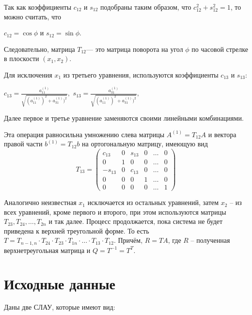 \documentclass[12pt, a4paper]{article}
\begin{document}
Так как коэффициенты $c_{12}$ и $s_{12}$ подобраны таким образом, что $c_{12}^{2} + s_{12}^{2}=1$, то можно считать, что 
\begin{center}
$c_{12}=\cos{\phi}$ и $s_{12}=\sin{\phi}.$ 
\end{center}	

Следовательно, матрица $T_{12}$--- это матрица поворота на угол $\phi$ по часовой стрелке в плоскости $(x_1,x_2)$. 

\pagebreak

Для исключения $x_1$ из третьего уравнения, используются коэффициенты $c_{13}$ и $s_{13}$:
\begin{center}
    $c_{13}=\frac{a_{11}^{(1)}}{\sqrt{(a_{11}^{(1)})^2+a_{31}^{(1)})^2}},$
    $s_{13}=\frac{a_{31}^{(1)}}{\sqrt{(a_{11}^{(1)})^2+a_{31}^{(1)})^2}},$
\end{center}
    
Далее первое и третье уравнение заменяются своими линейными комбинациями. 

Эта операция равносильна умножению слева матрицы $A^{(1)}=T_{12}A$ и вектора правой части $b^{(1)}=T_{12}b$ на ортогональную матрицу, имеющую вид 
\[
T_{13}=
\begin{pmatrix}
c_{13} & 0 & s_{13} & 0 & \ldots & 0 \\
0 & 1 & 0 & 0 & \ldots & 0 \\
-s_{13} & 0 & c_{13} & 0 & \ldots & 0 \\
0 & 0 & 0 & 1 & \ldots & 0 \\
0 & 0 & 0 & 0 & \ldots & 1
\end{pmatrix}
\]

Аналогично неизвестная $x_{1}$ исключается из остальных уравнений, затем \linebreak $x_{2}$ -- из всех уравнений, кроме первого и второго, при этом используются матрицы $T_{23},T_{24}, \ldots, T_{2n}$ и так далее. Процесс продолжается, пока система не будет приведена к верхней треугольной форме. То есть $ T = T_{n - 1, n} \cdot T_{24} \cdot T_{23} \cdot T_{1n} \cdot \ldots \cdot T_{13} \cdot T_{12}. $ Причём, $R=TA$, где $R$ -- полученная верхнетреугольная матрица и $Q=T^{-1}=T^{T}.$
\newpage

\section{Исходные данные}
Даны две СЛАУ, которые имеют вид: 
\end{document}
